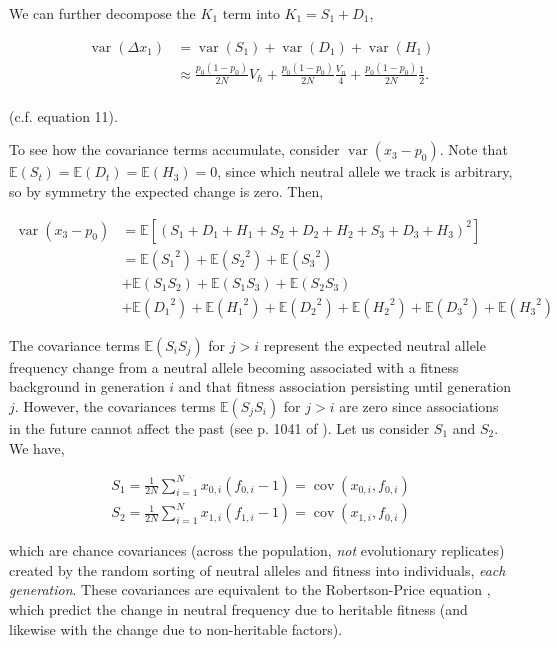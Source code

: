 \documentclass[11pt]{article}
\newcommand{\E}{\mathbb{E}}
\DeclareMathOperator{\var}{var}
\DeclareMathOperator{\cov}{cov}
\begin{document}
We can further decompose the $K_1$ term into $K_1 = S_1 + D_1$,

\begin{align}
  \var(\Delta x_1) &= \var(S_1) + \var(D_1) + \var(H_1) \\
  &\approx \frac{p_0(1-p_0)}{2N} V_h + \frac{p_0(1-p_0)}{2N} \frac{V_n}{4} + \frac{p_0(1-p_0)}{2N} \frac{1}{2}. \\
\end{align}

(c.f. \cite{Santiago1995-hx} equation 11).

To see how the covariance terms accumulate, consider $\var(x_3 - p_0)$. Note
that $\E(S_t) = \E(D_t) = \E(H_3) = 0$, since which neutral allele we track is
arbitrary, so by symmetry the expected change is zero. Then,

\begin{align}
  \label{eq:var_x}
  \var(x_3 - p_0) &= \E\left[ \left(S_1 + D_1 + H_1 + S_2 + D_2 + H_2 + S_3 + D_3 + H_3 \right)^2 \right] \\
                  &= \E({S_1}^2) + \E({S_2}^2) + \E({S_3}^2)  \\
                  &+ \E(S_1 S_2) + \E(S_1 S_3) + \E(S_2 S_3) \\
                  &+ \E({D_1}^2) + \E({H_1}^2) + \E({D_2}^2) + \E({H_2}^2) + \E({D_3}^2) + \E({H_3}^2)
\end{align}

The covariance terms $\E(S_i S_j)$ for $j > i$ represent the expected neutral
allele frequency change from a neutral allele becoming associated with a
fitness background in generation $i$ and that fitness association persisting
until generation $j$. However, the covariances terms $\E(S_j S_i)$ for $j > i$
are zero since associations in the future cannot affect the past (see p. 1041
of \cite{Buffalo2019-qs}). Let us consider $S_1$ and $S_2$. We have,

\begin{align}
  S_1 = \frac{1}{2N} \sum_{i=1}^N x_{0,i}(f_{0,i} - 1) = \cov(x_{0,i}, f_{0,i}) \\
  S_2 = \frac{1}{2N} \sum_{i=1}^N x_{1,i}(f_{1,i} - 1) = \cov(x_{1,i}, f_{0,i})
\end{align}

which are chance covariances (across the population, \emph{not} evolutionary
replicates) created by the random sorting of neutral alleles and fitness into
individuals, \emph{each generation}. These covariances are equivalent to the
Robertson-Price equation \parencite{Robertson1966-fs,Price1970-si}, which
predict the change in neutral frequency due to heritable fitness (and likewise
with the change due to non-heritable factors).
\end{document}
